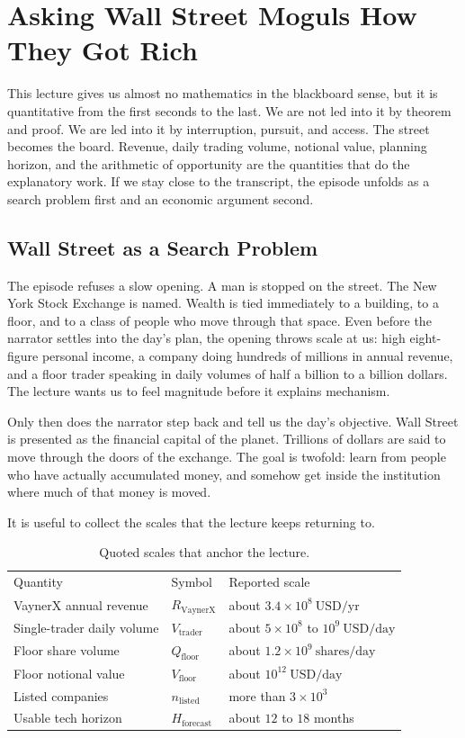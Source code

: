 \chapter{Asking Wall Street Moguls How They Got Rich}

This lecture gives us almost no mathematics in the blackboard sense, but it is quantitative from the first seconds to the last. We are not led into it by theorem and proof. We are led into it by interruption, pursuit, and access. The street becomes the board. Revenue, daily trading volume, notional value, planning horizon, and the arithmetic of opportunity are the quantities that do the explanatory work. If we stay close to the transcript, the episode unfolds as a search problem first and an economic argument second.

\section{Wall Street as a Search Problem}

The episode refuses a slow opening. A man is stopped on the street. The New York Stock Exchange is named. Wealth is tied immediately to a building, to a floor, and to a class of people who move through that space. Even before the narrator settles into the day's plan, the opening throws scale at us: high eight-figure personal income, a company doing hundreds of millions in annual revenue, and a floor trader speaking in daily volumes of half a billion to a billion dollars. The lecture wants us to feel magnitude before it explains mechanism.

Only then does the narrator step back and tell us the day's objective. Wall Street is presented as the financial capital of the planet. Trillions of dollars are said to move through the doors of the exchange. The goal is twofold: learn from people who have actually accumulated money, and somehow get inside the institution where much of that money is moved.

It is useful to collect the scales that the lecture keeps returning to.

\begin{table}[h]
\centering
\begin{tabular}{lll}
Quantity & Symbol & Reported scale \\
VaynerX annual revenue & $R_{\mathrm{VaynerX}}$ & about $3.4\times 10^8\ \mathrm{USD/yr}$ \\
Single-trader daily volume & $V_{\mathrm{trader}}$ & about $5\times 10^8$ to $10^9\ \mathrm{USD/day}$ \\
Floor share volume & $Q_{\mathrm{floor}}$ & about $1.2\times 10^9\ \mathrm{shares/day}$ \\
Floor notional value & $V_{\mathrm{floor}}$ & about $10^{12}\ \mathrm{USD/day}$ \\
Listed companies & $n_{\mathrm{listed}}$ & more than $3\times 10^3$ \\
Usable tech horizon & $H_{\mathrm{forecast}}$ & about $12$ to $18$ months \\
\end{tabular}
\caption{Quoted scales that anchor the lecture.}
\end{table}

